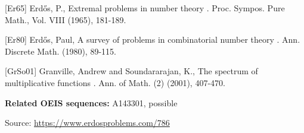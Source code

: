 \documentclass{article}
\begin{document}
[Er65] Erd\H{o}s, P., Extremal problems in number theory . Proc. Sympos. Pure Math., Vol. VIII (1965), 181-189.

[Er80] Erd\H{o}s, Paul, A survey of problems in combinatorial number theory . Ann. Discrete Math. (1980), 89-115.

[GrSo01] Granville, Andrew and Soundararajan, K., The spectrum of multiplicative functions . Ann. of Math. (2) (2001), 407-470.

\noindent\textbf{Related OEIS sequences:} A143301, possible


\bigskip
\noindent\small{Source: \url{https://www.erdosproblems.com/786}}
\end{document}
